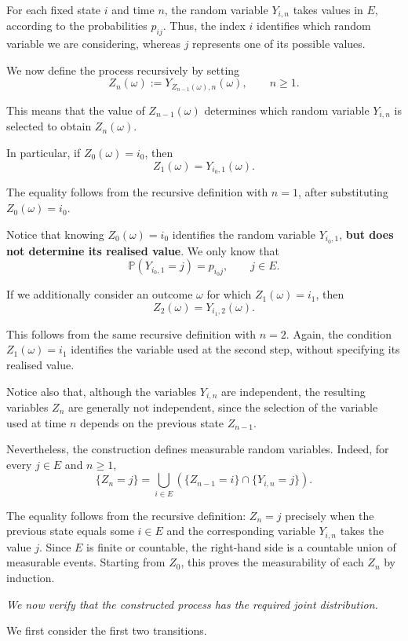 \documentclass[11pt,a4paper]{article}
\begin{document}
For each fixed state $i$ and time $n$, the random variable $Y_{i,n}$ takes values in $E$, according to the probabilities $p_{ij}$. Thus, the index $i$ identifies which random variable we are considering, whereas $j$ represents one of its possible values.

We now define the process recursively by setting
\[
Z_n(\omega):=Y_{Z_{n-1}(\omega),n}(\omega),
\qquad n\ge1.
\]

This means that the value of $Z_{n-1}(\omega)$ determines which random variable $Y_{i,n}$ is selected to obtain $Z_n(\omega)$.

In particular, if $Z_0(\omega)=i_0$, then
\[
Z_1(\omega)=Y_{i_0,1}(\omega).
\]

The equality follows from the recursive definition with $n=1$, after substituting $Z_0(\omega)=i_0$.

Notice that knowing $Z_0(\omega)=i_0$ identifies the random variable $Y_{i_0,1}$, \textbf{but does not determine its realised value}. We only know that
\[
\mathbb P(Y_{i_0,1}=j)=p_{i_0j},
\qquad j\in E.
\]

If we additionally consider an outcome $\omega$ for which $Z_1(\omega)=i_1$, then
\[
Z_2(\omega)=Y_{i_1,2}(\omega).
\]

This follows from the same recursive definition with $n=2$. Again, the condition $Z_1(\omega)=i_1$ identifies the variable used at the second step, without specifying its realised value.

Notice also that, although the variables $Y_{i,n}$ are independent, the resulting variables $Z_n$ are generally not independent, since the selection of the variable used at time $n$ depends on the previous state $Z_{n-1}$.

Nevertheless, the construction defines measurable random variables. Indeed, for every $j\in E$ and $n\ge1$,
\[
\{Z_n=j\}
=
\bigcup_{i\in E}
\left(
\{Z_{n-1}=i\}\cap\{Y_{i,n}=j\}
\right).
\]

The equality follows from the recursive definition: $Z_n=j$ precisely when the previous state equals some $i\in E$ and the corresponding variable $Y_{i,n}$ takes the value $j$. Since $E$ is finite or countable, the right-hand side is a countable union of measurable events. Starting from $Z_0$, this proves the measurability of each $Z_n$ by induction.

\emph{We now verify that the constructed process has the required joint distribution.}

We first consider the first two transitions.
\end{document}
